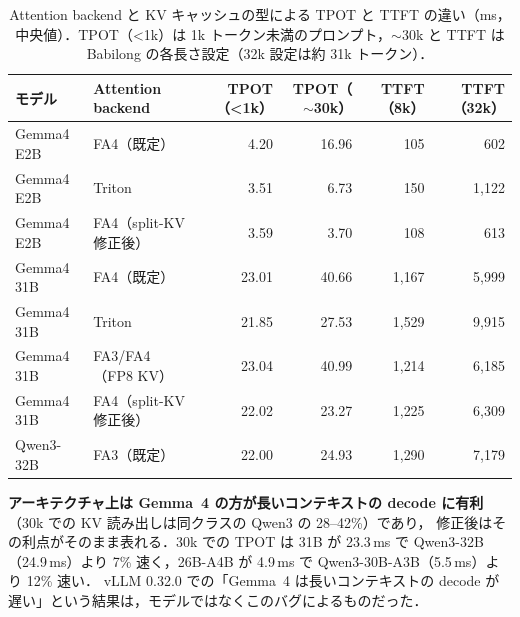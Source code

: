 \begin{table}[htbp]\centering\small
\caption{Attention backend と KV キャッシュの型による TPOT と TTFT の違い（ms，中央値）．TPOT（<1k）は 1k トークン未満のプロンプト，$\sim$30k と TTFT は Babilong の各長さ設定（32k 設定は約 31k トークン）．}
\label{tab:backend}
\begin{tabular}{llrrrr}\toprule
モデル & Attention backend & TPOT（<1k） & TPOT（$\sim$30k） & TTFT（8k） & TTFT（32k） \\\midrule
Gemma4 E2B & FA4（既定） & 4.20 & 16.96 & 105 & 602 \\
Gemma4 E2B & Triton & 3.51 & 6.73 & 150 & 1{,}122 \\
Gemma4 E2B & FA4（split-KV 修正後） & 3.59 & 3.70 & 108 & 613 \\
Gemma4 31B & FA4（既定） & 23.01 & 40.66 & 1{,}167 & 5{,}999 \\
Gemma4 31B & Triton & 21.85 & 27.53 & 1{,}529 & 9{,}915 \\
Gemma4 31B & FA3/FA4（FP8 KV） & 23.04 & 40.99 & 1{,}214 & 6{,}185 \\
Gemma4 31B & FA4（split-KV 修正後） & 22.02 & 23.27 & 1{,}225 & 6{,}309 \\
Qwen3-32B & FA3（既定） & 22.00 & 24.93 & 1{,}290 & 7{,}179 \\\bottomrule
\end{tabular}
\end{table}

\textbf{アーキテクチャ上は Gemma~4 の方が長いコンテキストの decode に有利}（30k での KV 読み出しは同クラスの Qwen3 の 28--42\%）であり，
修正後はその利点がそのまま表れる．30k での TPOT は 31B が 23.3\,ms で Qwen3-32B（24.9\,ms）より 7\% 速く，26B-A4B が 4.9\,ms で Qwen3-30B-A3B（5.5\,ms）より 12\% 速い．
vLLM 0.32.0 での「Gemma~4 は長いコンテキストの decode が遅い」という結果は，モデルではなくこのバグによるものだった．

